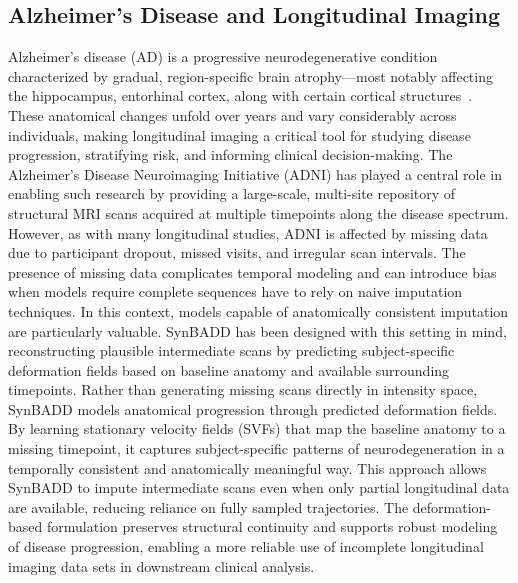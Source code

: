 \subsection{Alzheimer's Disease and Longitudinal Imaging}

Alzheimer’s disease (AD) is a progressive neurodegenerative condition characterized by gradual, region-specific brain atrophy—most notably affecting the hippocampus, entorhinal cortex, along with certain cortical structures~\cite{braak1991neuropathological,barnes2009atrophy}. These anatomical changes unfold over years and vary considerably across individuals, making longitudinal imaging a critical tool for studying disease progression, stratifying risk, and informing clinical decision-making. The Alzheimer's Disease Neuroimaging Initiative (ADNI) has played a central role in enabling such research by providing a large-scale, multi-site repository of structural MRI scans acquired at multiple timepoints along the disease spectrum. However, as with many longitudinal studies, ADNI is affected by missing data due to participant dropout, missed visits, and irregular scan intervals. The presence of missing data complicates temporal modeling and can introduce bias when models require complete sequences have to rely on naive imputation techniques. In this context, models capable of anatomically consistent imputation are particularly valuable. SynBADD has been designed with this setting in mind, reconstructing plausible intermediate scans by predicting subject-specific deformation fields based on baseline anatomy and available surrounding timepoints. Rather than generating missing scans directly in intensity space, SynBADD models anatomical progression through predicted deformation fields. By learning stationary velocity fields (SVFs) that map the baseline anatomy to a missing timepoint, it captures subject-specific patterns of neurodegeneration in a temporally consistent and anatomically meaningful way. This approach allows SynBADD to impute intermediate scans even when only partial longitudinal data are available, reducing reliance on fully sampled trajectories. The deformation-based formulation preserves structural continuity and supports robust modeling of disease progression, enabling a more reliable use of incomplete longitudinal imaging data sets in downstream clinical analysis.






